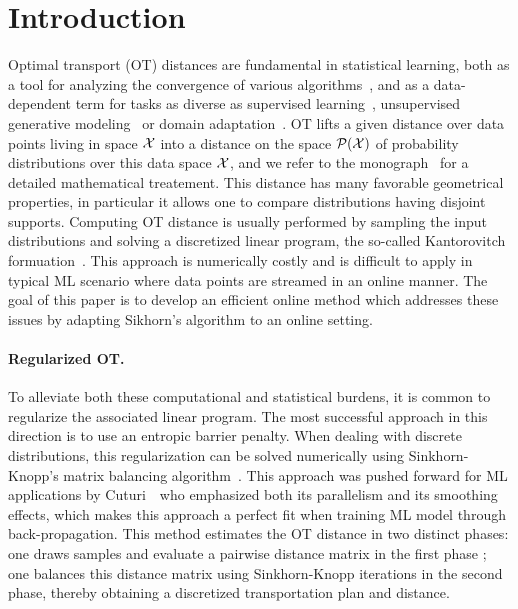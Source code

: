 \section{Introduction}

Optimal transport (OT) distances are fundamental in statistical learning, both as a tool for analyzing the convergence of various algorithms~\cite{canas2012learning,dalalyan2019user}, and as a data-dependent term for tasks as diverse as supervised learning~\cite{frogner2015learning}, unsupervised generative modeling~\cite{arjovsky2017wgan} or domain adaptation~\cite{courty2016optimal}.
%
OT lifts a given distance over data points living in space $\mathcal{X}$ into a distance
on the space $\mathcal{P}(\mathcal{X})$ of probability distributions over this data space $\mathcal{X}$, and we refer to the monograph~\cite{santambrogio2015optimal} for a detailed mathematical treatement.
%
This distance has many favorable geometrical properties, in particular it allows one to compare distributions having disjoint supports. 
% 
Computing OT distance is usually performed by sampling the input distributions and solving a discretized linear program, the so-called Kantorovitch formuation~\cite{Kantorovich42}. This approach is numerically costly and is difficult to apply in typical ML scenario where data points are streamed in an online manner.   
%
The goal of this paper is to develop an efficient online method which addresses these issues by adapting Sikhorn's algorithm to an online setting.
  


\paragraph{Regularized OT.}

To alleviate both these computational and statistical burdens, it is common to regularize the associated linear program.
%
The most successful approach in this direction is to use an entropic barrier penalty. 
%
When dealing with discrete distributions, this regularization can be solved numerically using Sinkhorn-Knopp's matrix balancing algorithm~\cite{Sinkhorn64,sinkhorn1967concerning}.
%
This approach was pushed forward for ML applications by Cuturi~\cite{cuturi2013sinkhorn} who emphasized both its parallelism and its smoothing effects, which makes this approach a perfect fit when training ML model through back-propagation.
%
This method estimates the OT distance in two distinct phases: one draws samples and evaluate a pairwise distance matrix in the first phase ; one balances this distance matrix using Sinkhorn-Knopp iterations in the second phase, thereby obtaining a discretized 
transportation plan and distance.

